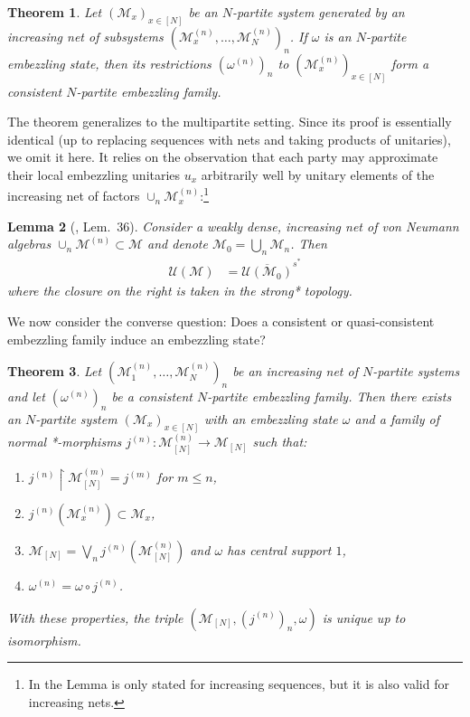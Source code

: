 \documentclass[a4paper, 10pt, onecolumn, accepted=2025-07-22]{quantumarticle}
\newtheorem{theorem}{Theorem}
\newtheorem{lemma}[theorem]{Lemma}
\theoremstyle{definition}
\newcommand{\mc}{\mathcal}
\newcommand{\up}[1]{^{(#1)}}
\def\M{{\mc M}}
\def\U{{\mc U}}
\newcommand*{\1}{\text{\usefont{U}{bbold}{m}{n}1}}
\begin{document}
\begin{theorem}\label{thm:state-to-family}
    Let $(\M_x)_{x\in[N]}$ be an $N$-partite system generated by an increasing net of subsystems $(\M\up{n}_x,\ldots,\M\up{n}_N)_n$.
    If $\omega$ is an $N$-partite embezzling state, then its restrictions $(\omega^{(n)})_n$ to $(\M^{(n)}_x)_{x\in[N]}$ form a consistent $N$-partite embezzling family.
\end{theorem}
The theorem generalizes \cite[Thm. 35]{van_luijk_critical_2024} to the multipartite setting. 
Since its proof is essentially identical (up to replacing sequences with nets and taking products of unitaries), we omit it here.
It relies on the observation that each party may approximate their local embezzling unitaries $u_x$ arbitrarily well by unitary elements of the increasing net of factors $\cup_n \M^{(n)}_x$:\footnote{In \cite{van_luijk_critical_2024} the Lemma is only stated for increasing sequences, but it is also valid for increasing nets.}
\begin{lemma}[\cite{van_luijk_critical_2024}, Lem.~36]
\label{lem:unitary_closure}
Consider a weakly dense, increasing net of von Neumann algebras $\cup_n \M^{(n)}\subset \M$ and denote $\M_{0}=\bigcup_{n}\M_{n}$. Then
\begin{align}
\label{eq:unitary_closure}
\U(\M) & = \overline{\U(\M_{0})}^{s^*}
\end{align}
where the closure on the right is taken in the strong* topology.
\end{lemma}
We now consider the converse question: Does a consistent or quasi-consistent embezzling family induce an embezzling state?
\begin{theorem}\label{thm:consistent-to-state}
    Let $(\M^{(n)}_1,\ldots,\M^{(n)}_N)_{n}$ be an increasing net of $N$-partite systems and let $(\omega^{(n)})_{n}$ be a consistent $N$-partite embezzling family.
    Then there exists an $N$-partite system $(\M_x)_{x\in[N]}$ with an embezzling state $\omega$ and a family of normal *-morphisms $j^{(n)}:\M^{(n)}_{[N]}\to \M_{[N]}$ such that:
    \begin{enumerate}
    \item $j^{(n)}\restriction \M^{(m)}_{[N]} = j^{(m)}$ for $m\leq n$,
    \item  $j^{(n)}(\M^{(n)}_x) \subset \M_x$, 
    \item $\M_{[N]} = \bigvee_n j^{(n)}(\M^{(n)}_{[N]})$ and  $\omega$ has central support $1$,
    \item $\omega^{(n)} = \omega\circ j^{(n)}$.
    \end{enumerate}
    With these properties, the triple $(\M_{[N]},(j^{(n)})_n,\omega)$ is unique up to isomorphism.
\end{theorem}
\end{document}
